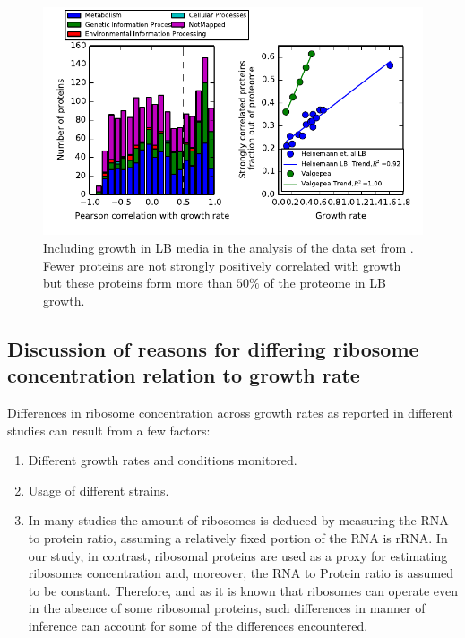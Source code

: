 \documentclass[a4paper]{article}
\begin{document}
\begin{figure}[H]
\begin{center}
\includegraphics[width=1\columnwidth]{HeinemannsummaryHistAndGr.pdf}
\caption{\label{fig:LB}
Including growth in LB media in the analysis of the data set from \cite{Heinemann2015}.
Fewer proteins are not strongly positively correlated with growth but these proteins form more than $50\%$ of the proteome in LB growth.}
\end{center}
\end{figure}

\subsection{Discussion of reasons for differing ribosome concentration relation to growth rate}
\label{ribosomeconc} 

Differences in ribosome concentration  across growth rates as reported in different studies can result from a few factors:
\begin{enumerate}
\item Different growth rates and conditions monitored.
\item Usage of different strains.
\item In many studies the amount of ribosomes is deduced by measuring the RNA to protein ratio, assuming a relatively fixed portion of the RNA is rRNA.
In our study, in contrast, ribosomal proteins are used as a proxy for estimating ribosomes concentration and, moreover, the RNA to Protein ratio is assumed to be constant.
Therefore, and as it is known that ribosomes can operate even in the absence of some ribosomal proteins, such differences in manner of inference can account for some of the differences encountered.
\end{enumerate}
\end{document}
